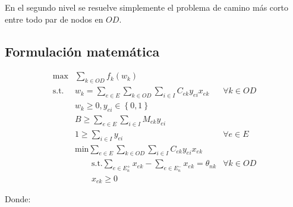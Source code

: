 \documentclass{article}
\begin{document}
  En el segundo nivel se resuelve simplemente el problema de camino más corto entre todo par de nodos en $OD$.

  \subsection{Formulación matemática}

  \begin{align}
    \text{max}    & \sum_{k \in OD} f_k(w_k)                                      & \label{eq:objective1lvl} \\
    \text{s.t.}\; & w_k = \sum_{e \in E} \sum_{k \in OD} \sum_{i \in I} C_{ek}y_{ei}x_{ek} & \forall k \in OD \label{eq:shortestpath} \\
                  & w_k \geq 0, y_{ei} \in \left\{ 0, 1 \right\}      & \nonumber \\
                  & B \geq \sum_{e \in E} \sum_{i \in I} M_{ek}y_{ei} & \label{eq:respectbudget} \\
                  & 1 \geq \sum_{i \in I} y_{ei}                      & \forall e \in E \label{eq:atmostoney} \\
                  & \text{min} \sum_{e \in E} \sum_{k \in OD} \sum_{i \in I} C_{ek}y_{ei}x_{ek} & \label{eq:subproblem} \\
                  & \hspace{2em} \text{s.t.} \sum_{e \in E_n^+} x_{ek} - \sum_{e \in E_n^-} x_{ek} = \theta_{nk}  & \forall k \in OD \label  {eq:flowbalance} \\
                  & \hspace{2em} x_{ek} \geq 0  & \nonumber
  \end{align}

  Donde:
\end{document}

